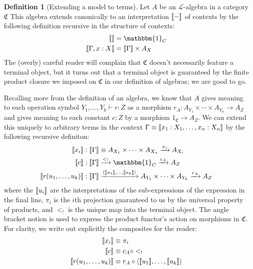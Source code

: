 \documentclass[12pt,twoside]{reedthesis}
\theoremstyle{definition}
\newtheorem{definition}{Definition}
\theoremstyle{remark}
\theoremstyle{plain}
\begin{document}
\begin{definition}[Extending a model to terms]\label{def:term model}
  Let $A$ be an $\mathcal{L}$-algebra in a category $\mathfrak{C}$ This algebra
  extends canonically to an interpretation $\llbracket-\rrbracket$ of contexts by the
  following definition recursive in the structure of contexts:
  \begin{align}
    \label{eq:contexts interp}
    \sem{} &= \mathbbm{1}_{C} \\
    \sem{\Gamma, x : X} &= \sem{\Gamma} \times A_{X}
  \end{align}
  The (overly) careful reader will complain that $\mathfrak{C}$ doesn't
  necessarily feature a terminal object, but it turns out that a terminal object
  is guaranteed by the finite product closure we imposed on $\mathfrak{C}$ in
  our definition of algebras; we are good to go.

  Recalling more from the definition of an algebra, we know that $A$ gives
  meaning to each operation symbol \( Y_{1},\dots , Y_{k} \vdash r : Z \) as a
  morphism \( r_{A} : A_{Y_{1}} \times \cdots \times A_{Y_{k}} \rightarrow A_{Z} \) and gives meaning to
  each constant \( c : Z \) by a morphism \( 1_{\mathfrak{C}} \rightarrow A_{Z} \). We can
  extend this uniquely to arbitrary terms in the context
  \( \Gamma \equiv \llbracket x_{1} : X_{1}, \dots , x_{n} : X_{n}\rrbracket \) by the following
  recursive definiton:
  \begin{align}
    \label{eq:term interp}
    \sem{x_{i}} &: \sem{\Gamma} \equiv A_{X_{1}} \times \cdots \times A_{X_{n}} \xrightarrow{\pi_{i}} A_{X_{i}} \\
    \sem{c} &: \sem{\Gamma} \xrightarrow{<_{!}} \mathbbm{1}_{C} \xrightarrow{c_{A}} A_{Z} \\
    \sem{r(u_{1}, \dots , u_{k})} &: \sem{\Gamma} \xrightarrow{\braket{\sem{u_{1}}, \dots, \sem{u_{k}}}} A_{Y_{1}} \times \cdots \times A_{Y_{k}} \xrightarrow{r_{A}} A_{Z}
  \end{align}
  where the $\llbracket u_{i}\rrbracket$ are the interpretations of the sub-expressions of the
  expression in the final line, $\pi_{i}$ is the $i$th projection guaranteed to us
  by the universal property of products, and $<_{!}$ is the unique map into the
  terminal object. The angle bracket notion is used to express the product
  functor's action on morphisms in $\mathfrak{C}$. For clarity, we write out
  explicitly the composites for the reader:
  \begin{align*}
    \llbracket x_{i}\rrbracket &\equiv \pi_{i} \\
    \llbracket c\rrbracket &\equiv c_{A } \circ <_{!} \\
    \llbracket r(u_{1}, \dots , u_{k})\rrbracket &\equiv r_{A} \circ \braket{\llbracket u_{1}\rrbracket, \dots,\llbracket u_{k}\rrbracket}
  \end{align*}
\end{definition}
\end{document}
